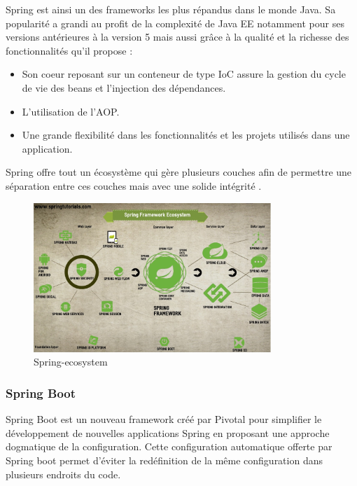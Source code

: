 Spring est ainsi un des frameworks les plus r\'epandus dans le monde Java. Sa popularit\'e a grandi au profit de la complexit\'e de Java EE notamment pour ses versions ant\'erieures \`a la version 5 mais aussi gr\^ace \`a la qualit\'e et la richesse des fonctionnalit\'es qu'il propose : 
\begin{itemize}
\item Son coeur reposant sur un conteneur de type IoC assure la gestion du cycle de vie des beans et l'injection des d\'ependances.
\item L'utilisation de l'AOP. 
\item Une grande flexibilit\'e dans les fonctionnalit\'es et les projets utilis\'es dans une application.
\end{itemize}
Spring offre tout un \'ecosyst\`eme qui g\`ere plusieurs couches afin de permettre une s\'eparation entre ces couches mais avec une solide int\'egrit\'e \cite{spr}.
\newpage
\begin{figure}[!ht]\centering
\includegraphics[width=0.8\textwidth]{chapitres/chapitrex/figures/spring-ecosystem.jpg}
\caption{Spring-ecosystem}
\label{fig:spring-ecosystem}
\end{figure}
\subsubsection*{Spring Boot}
Spring Boot est un nouveau framework cr\'e\'e par Pivotal pour simplifier le d\'eveloppement de nouvelles applications Spring en proposant une approche dogmatique de la configuration. Cette configuration automatique offerte par Spring boot permet d'\'eviter la red\'efinition de la m\^eme configuration dans plusieurs endroits du code.

